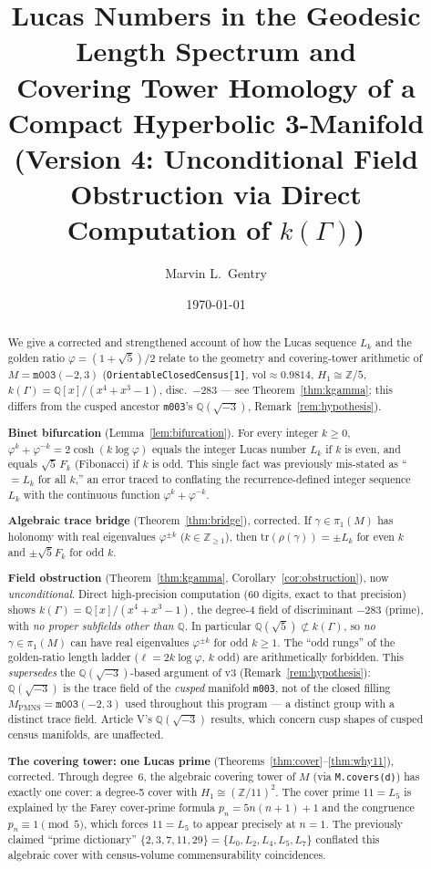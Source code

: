 \documentclass[12pt]{article}
\title{Lucas Numbers in the Geodesic Length Spectrum and\\
Covering Tower Homology of a Compact Hyperbolic 3-Manifold\\
\large (Version 4: Unconditional Field Obstruction via Direct
Computation of $k(\Gamma)$)}
\author[1]{Marvin L.\ Gentry}
\affil[1]{Independent Researcher, Seattle, WA\\
\texttt{drmlgentry@protonmail.com} \quad ORCID: 0009-0006-4550-2663}
\date{\today}
\theoremstyle{definition}
\newcommand{\Z}{\mathbb{Z}}
\newcommand{\Q}{\mathbb{Q}}
\newcommand{\ph}{\varphi}
\newcommand{\logph}{\log\ph}
\newcommand{\tr}{\mathrm{tr}}
\begin{document}
\maketitle

\begin{abstract}
We give a corrected and strengthened account of how the Lucas
sequence $L_k$ and the golden ratio $\ph=(1+\sqrt5)/2$ relate to the
geometry and covering-tower arithmetic of
$M=\texttt{m003}(-2,3)$ (\texttt{OrientableClosedCensus[1]},
$\mathrm{vol}\approx0.9814$, $H_1\cong\Z/5$,
$k(\Gamma)=\Q[x]/(x^4+x^3-1)$, disc.\ $-283$ ---
see Theorem~\ref{thm:kgamma}; this differs from the cusped ancestor
\texttt{m003}'s $\Q(\sqrt{-3})$, Remark~\ref{rem:hypothesis}).

\textbf{Binet bifurcation} (Lemma~\ref{lem:bifurcation}). For every
integer $k\geq0$,
$\ph^k+\ph^{-k}=2\cosh(k\logph)$ equals the integer Lucas number $L_k$
if $k$ is even, and equals $\sqrt5\,F_k$ (Fibonacci) if $k$ is odd.
This single fact was previously mis-stated as ``$=L_k$ for all $k$,''
an error traced to conflating the recurrence-defined integer sequence
$L_k$ with the continuous function $\ph^k+\ph^{-k}$.

\textbf{Algebraic trace bridge} (Theorem~\ref{thm:bridge}), corrected.
If $\gamma\in\pi_1(M)$ has holonomy with real eigenvalues $\ph^{\pm k}$
($k\in\Z_{\geq1}$), then $\tr(\rho(\gamma))=\pm L_k$ for even $k$ and
$\pm\sqrt5 F_k$ for odd $k$.

\textbf{Field obstruction} (Theorem~\ref{thm:kgamma},
Corollary~\ref{cor:obstruction}), now \emph{unconditional}. Direct
high-precision computation (60 digits, exact to that precision) shows
$k(\Gamma)=\Q[x]/(x^4+x^3-1)$, the degree-4 field of discriminant
$-283$ (prime), with \emph{no proper subfields other than $\Q$}. In
particular $\Q(\sqrt5)\not\subset k(\Gamma)$, so \emph{no}
$\gamma\in\pi_1(M)$ can have real eigenvalues $\ph^{\pm k}$ for odd
$k\geq1$. The ``odd rungs'' of the golden-ratio length ladder
($\ell=2k\logph$, $k$ odd) are arithmetically forbidden. This
\emph{supersedes} the $\Q(\sqrt{-3})$-based argument of v3
(Remark~\ref{rem:hypothesis}): $\Q(\sqrt{-3})$ is the trace field of
the \emph{cusped} manifold \texttt{m003}, not of the closed filling
$M_{\mathrm{PMNS}}=\texttt{m003}(-2,3)$ used throughout this
program --- a distinct group with a distinct trace field. Article V's
$\Q(\sqrt{-3})$ results, which concern cusp shapes of cusped census
manifolds, are unaffected.

\textbf{The covering tower: one Lucas prime}
(Theorems~\ref{thm:cover}--\ref{thm:why11}), corrected. Through
degree~6, the algebraic covering tower of $M$
(via \texttt{M.covers(d)}) has exactly one cover: a degree-5 cover
with $H_1\cong(\Z/11)^2$. The cover prime $11=L_5$ is explained by the
Farey cover-prime formula $p_n=5n(n+1)+1$ and the congruence
$p_n\equiv1\pmod5$, which forces $11=L_5$ to appear precisely at
$n=1$. The previously claimed ``prime dictionary''
$\{2,3,7,11,29\}=\{L_0,L_2,L_4,L_5,L_7\}$ conflated this algebraic
cover with census-volume commensurability coincidences.
\end{abstract}
\end{document}
